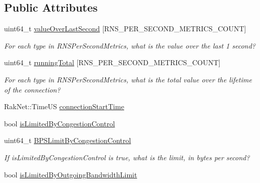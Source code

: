 \subsection*{Public Attributes}
\begin{DoxyCompactItemize}
\item 
\hypertarget{struct_rak_net_1_1_rak_net_statistics_a4197b81e3222a38189543f6148f9419a}{uint64\-\_\-t \hyperlink{struct_rak_net_1_1_rak_net_statistics_a4197b81e3222a38189543f6148f9419a}{value\-Over\-Last\-Second} \mbox{[}R\-N\-S\-\_\-\-P\-E\-R\-\_\-\-S\-E\-C\-O\-N\-D\-\_\-\-M\-E\-T\-R\-I\-C\-S\-\_\-\-C\-O\-U\-N\-T\mbox{]}}\label{struct_rak_net_1_1_rak_net_statistics_a4197b81e3222a38189543f6148f9419a}

\begin{DoxyCompactList}\small\item\em For each type in R\-N\-S\-Per\-Second\-Metrics, what is the value over the last 1 second? \end{DoxyCompactList}\item 
\hypertarget{struct_rak_net_1_1_rak_net_statistics_ae67e3487f97e23a4d7ca72f4a55b0912}{uint64\-\_\-t \hyperlink{struct_rak_net_1_1_rak_net_statistics_ae67e3487f97e23a4d7ca72f4a55b0912}{running\-Total} \mbox{[}R\-N\-S\-\_\-\-P\-E\-R\-\_\-\-S\-E\-C\-O\-N\-D\-\_\-\-M\-E\-T\-R\-I\-C\-S\-\_\-\-C\-O\-U\-N\-T\mbox{]}}\label{struct_rak_net_1_1_rak_net_statistics_ae67e3487f97e23a4d7ca72f4a55b0912}

\begin{DoxyCompactList}\small\item\em For each type in R\-N\-S\-Per\-Second\-Metrics, what is the total value over the lifetime of the connection? \end{DoxyCompactList}\item 
Rak\-Net\-::\-Time\-U\-S \hyperlink{struct_rak_net_1_1_rak_net_statistics_aa4de4877ca5c69f70c4176e6d50b69ce}{connection\-Start\-Time}
\item 
bool \hyperlink{struct_rak_net_1_1_rak_net_statistics_a7e8881dd2f72099037a69ba3cd0b989d}{is\-Limited\-By\-Congestion\-Control}
\item 
\hypertarget{struct_rak_net_1_1_rak_net_statistics_aa83e53ef2fc8353a8111929fa869eb5e}{uint64\-\_\-t \hyperlink{struct_rak_net_1_1_rak_net_statistics_aa83e53ef2fc8353a8111929fa869eb5e}{B\-P\-S\-Limit\-By\-Congestion\-Control}}\label{struct_rak_net_1_1_rak_net_statistics_aa83e53ef2fc8353a8111929fa869eb5e}

\begin{DoxyCompactList}\small\item\em If {\itshape is\-Limited\-By\-Congestion\-Control} is true, what is the limit, in bytes per second? \end{DoxyCompactList}\item 
\hypertarget{struct_rak_net_1_1_rak_net_statistics_acea90f1f18f76fdc30d9debc45f1ccb4}{bool \hyperlink{struct_rak_net_1_1_rak_net_statistics_acea90f1f18f76fdc30d9debc45f1ccb4}{is\-Limited\-By\-Outgoing\-Bandwidth\-Limit}}\label{struct_rak_net_1_1_rak_net_statistics_acea90f1f18f76fdc30d9debc45f1ccb4}


\end{DoxyCompactItemize}
